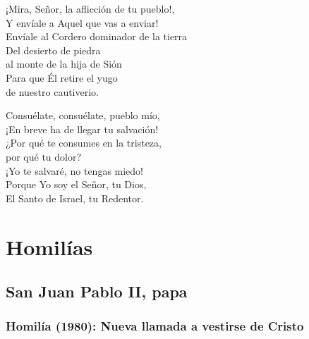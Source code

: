 ¡Mira, Señor, la aflicción de tu pueblo!,\\ Y envíale a Aquel que vas a enviar!\\ Envíale al Cordero dominador de la tierra\\ Del desierto de piedra\\ al monte de la hija de Sión\\ Para que Él retire el yugo\\ de nuestro cautiverio.

Consuélate, consuélate, pueblo mío,\\ ¡En breve ha de llegar tu salvación!\\ ¿Por qué te consumes en la tristeza,\\ por qué tu dolor?\\ ¡Yo te salvaré, no tengas miedo!\\ Porque Yo soy el Señor, tu Dios,\\ El Santo de Israel, tu Redentor.\strut


\newsection

	\section{Homilías}

		\subsection{San Juan Pablo II, papa}

			\subsubsection{Homilía (1980): Nueva llamada a vestirse de Cristo}
			

